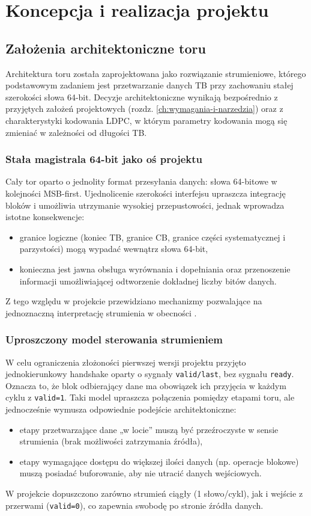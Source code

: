 \chapter{Koncepcja i realizacja projektu}
\label{ch:koncepcja_i_realizacja}

\section{Założenia architektoniczne toru}
\label{sec:arch_zalozenia}

Architektura toru została zaprojektowana jako rozwiązanie strumieniowe, którego podstawowym zadaniem jest przetwarzanie danych TB przy zachowaniu stałej szerokości słowa 64-bit. Decyzje architektoniczne wynikają bezpośrednio z przyjętych założeń projektowych (rozdz. \ref{ch:wymagania-i-narzedzia}) oraz z charakterystyki kodowania LDPC, w którym parametry kodowania mogą się zmieniać w zależności od długości TB.

\subsection{Stała magistrala 64-bit jako oś projektu}
Cały tor oparto o jednolity format przesyłania danych: słowa 64-bitowe w kolejności MSB-first. Ujednolicenie szerokości interfejsu upraszcza integrację bloków i umożliwia utrzymanie wysokiej przepustowości, jednak wprowadza istotne konsekwencje:
\begin{itemize}
    \item granice logiczne (koniec TB, granice CB, granice części systematycznej i parzystości) mogą wypadać wewnątrz słowa 64-bit,
    \item konieczna jest jawna obsługa wyrównania i dopełniania oraz przenoszenie informacji umożliwiającej odtworzenie dokładnej liczby bitów danych.
\end{itemize}
Z tego względu w projekcie przewidziano mechanizmy pozwalające na jednoznaczną interpretację strumienia w obecności .

\subsection{Uproszczony model sterowania strumieniem}
W celu ograniczenia złożoności pierwszej wersji projektu przyjęto jednokierunkowy handshake oparty o sygnały \texttt{valid/last}, bez sygnału \texttt{ready}. Oznacza to, że blok odbierający dane ma obowiązek ich przyjęcia w każdym cyklu z \texttt{valid=1}. Taki model upraszcza połączenia pomiędzy etapami toru, ale jednocześnie wymusza odpowiednie podejście architektoniczne:
\begin{itemize}
    \item etapy przetwarzające dane „w locie” muszą być przeźroczyste w sensie strumienia (brak możliwości zatrzymania źródła),
    \item etapy wymagające dostępu do większej ilości danych (np. operacje blokowe) muszą posiadać buforowanie, aby nie utracić danych wejściowych.
\end{itemize}
W projekcie dopuszczono zarówno strumień ciągły (1 słowo/cykl), jak i wejście z przerwami (\texttt{valid=0}), co zapewnia swobodę po stronie źródła danych.

